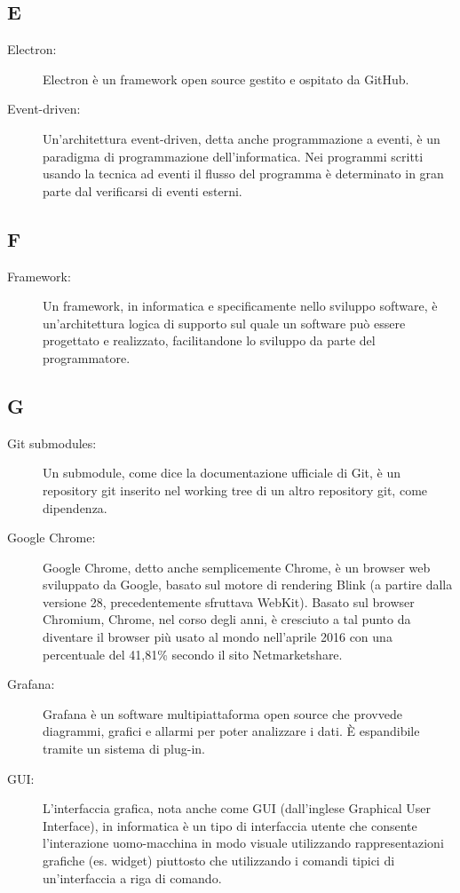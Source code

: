 \documentclass[../manuale-sviluppatore.tex]{subfiles}
\begin{document}
\subsection*{E}
\begin{description}
  \item[Electron:] Electron è un framework open source gestito e ospitato da GitHub.
  \item[Event-driven:] Un'architettura event-driven, detta anche programmazione a eventi, è un paradigma di programmazione dell'informatica. Nei programmi scritti usando la tecnica ad eventi il flusso del programma è determinato in gran parte dal verificarsi di eventi esterni.
\end{description}

\subsection*{F}
\begin{description}
  \item[Framework:] Un framework, in informatica e specificamente nello sviluppo software, è un'architettura logica di supporto sul quale un software può essere progettato e realizzato, facilitandone lo sviluppo da parte del programmatore.
\end{description}

\subsection*{G}
\begin{description}
  \item[Git submodules:] Un submodule, come dice la documentazione ufficiale di Git, è un repository git inserito nel working tree di un altro repository git, come dipendenza.
  \item[Google Chrome:] Google Chrome, detto anche semplicemente Chrome, è un browser web sviluppato da Google, basato sul motore di rendering Blink (a partire dalla versione 28, precedentemente sfruttava WebKit).
Basato sul browser Chromium, Chrome, nel corso degli anni, è cresciuto a tal punto da diventare il browser più usato al mondo nell'aprile 2016 con una percentuale del 41,81\% secondo il sito Netmarketshare.
  \item[Grafana:] Grafana è un software multipiattaforma open source che provvede diagrammi, grafici e allarmi per poter analizzare i dati. È espandibile tramite un sistema di plug-in.
  \item[GUI:] L'interfaccia grafica, nota anche come GUI (dall'inglese Graphical User Interface), in informatica è un tipo di interfaccia utente che consente l'interazione uomo-macchina in modo visuale utilizzando rappresentazioni grafiche (es. widget) piuttosto che utilizzando i comandi tipici di un'interfaccia a riga di comando.
\end{description}
\end{document}
